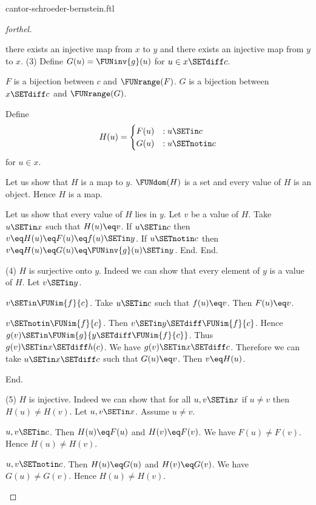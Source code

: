 \documentclass{stex}
\begin{document}
\begin{smodule}{cantor-schroeder-bernstein.ftl}
\begin{proof}[forthel]
\begin{case}{there exists an injective map from $x$ to $y$ and there exists an injective map from $y$ to $x$.}
    (3) Define $G(u) = \FUNinv{g}(u)$ for $u \in x \SETdiff c$.

    $F$ is a bijection between $c$ and $\FUNrange(F)$.
    $G$ is a bijection between $x \SETdiff c$ and $\FUNrange(G)$.

    Define \[ H(u) =
      \begin{cases}
        F(u) & : u \SETin c \\
        G(u) & : u \SETnotin c
      \end{cases} \]
    for $u \in x$.

    Let us show that $H$ is a map to $y$.
      $\FUNdom(H)$ is a set and every value of $H$ is an object.
      Hence $H$ is a map.

      Let us show that every value of $H$ lies in $y$.
        Let $v$ be a value of $H$.
        Take $u \SETin x$ such that $H(u) \eq v$.
        If $u \SETin c$ then $v \eq H(u) \eq F(u) \eq f(u) \SETin y$.
        If $u \SETnotin c$ then $v \eq H(u) \eq G(u) \eq \FUNinv{g}(u) \SETin y$.
      End.
    End.

    (4) $H$ is surjective onto $y$.
    Indeed we can show that every element of $y$ is a value of $H$.
      Let $v \SETin y$.

      \begin{case}{$v \SETin \FUNim{f}{c}$.}
        Take $u \SETin c$ such that $f(u) \eq v$.
        Then $F(u) \eq v$.
      \end{case}

      \begin{case}{$v \SETnotin \FUNim{f}{c}$.}
        Then $v \SETin y \SETdiff \FUNim{f}{c}$.
        Hence $g(v) \SETin \FUNim{g}{y \SETdiff \FUNim{f}{c}}$.
        Thus $g(v) \SETin x \SETdiff h(c)$.
        We have $g(v) \SETin x \SETdiff c$.
        Therefore we can take $u \SETin x \SETdiff c$ such that $G(u) \eq v$.
        Then $v \eq H(u)$.
      \end{case}
    End.

    (5) $H$ is injective.
    Indeed we can show that for all $u, v \SETin x$ if $u \neq v$ then $H(u) \neq H(v)$.
      Let $u,v \SETin x$.
      Assume $u \neq v$.

      \begin{case}{$u,v \SETin c$.}
        Then $H(u) \eq F(u)$ and $H(v) \eq F(v)$.
        We have $F(u) \neq F(v)$.
        Hence $H(u) \neq H(v)$.
      \end{case}

      \begin{case}{$u,v \SETnotin c$.}
        Then $H(u) \eq G(u)$ and $H(v) \eq G(v)$.
        We have $G(u) \neq G(v)$.
        Hence $H(u) \neq H(v)$.
      \end{case}


\end{case}
\end{proof}
\end{smodule}
\end{document}

